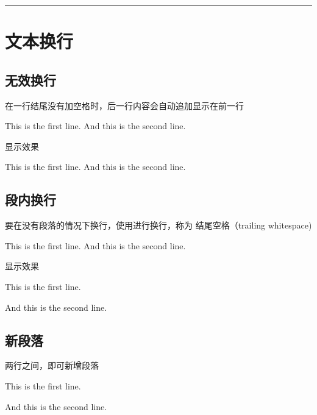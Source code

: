 \documentclass[letterpaper,10pt,english]{sphinxmanual}
\begin{document}
\bigskip\hrule\bigskip



\section{文本换行}
\label{\detokenize{other/myst_markdown:id5}}
\sphinxAtStartPar
{}


\subsection{无效换行}
\label{\detokenize{other/myst_markdown:id6}}
\sphinxAtStartPar
在一行结尾没有加空格时，后一行内容会自动追加显示在前一行

\begin{sphinxVerbatim}[commandchars=\\\{\}]
This is the first line.  
And this is the second line.
\end{sphinxVerbatim}

\sphinxAtStartPar
显示效果

\sphinxAtStartPar
This is the first line.
And this is the second line.


\subsection{段内换行}
\label{\detokenize{other/myst_markdown:id7}}
\sphinxAtStartPar
要在没有段落的情况下换行，使用进行换行，称为 结尾空格（trailing whitespace)

\begin{sphinxVerbatim}[commandchars=\\\{\}]
This is the first line.  
And this is the second line.
\end{sphinxVerbatim}

\sphinxAtStartPar
显示效果

\sphinxAtStartPar
This is the first line.

\sphinxAtStartPar
And this is the second line.


\subsection{新段落}
\label{\detokenize{other/myst_markdown:id8}}
\sphinxAtStartPar
两行之间，即可新增段落

\begin{sphinxVerbatim}[commandchars=\\\{\}]
This is the first line.

And this is the second line.
\end{sphinxVerbatim}
\end{document}
